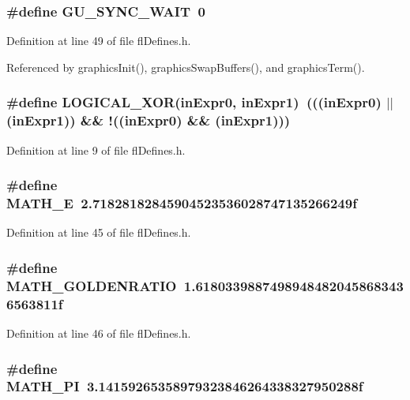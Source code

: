 \subsubsection{\setlength{\rightskip}{0pt plus 5cm}\#define GU\_\-SYNC\_\-WAIT~0}\label{flDefines_8h_0d7196c453c3aa3d6738b949cb2f82e6}




Definition at line 49 of file fl\-Defines.h.

Referenced by graphics\-Init(), graphics\-Swap\-Buffers(), and graphics\-Term().
\subsubsection{\setlength{\rightskip}{0pt plus 5cm}\#define LOGICAL\_\-XOR(in\-Expr0, in\-Expr1)~(((in\-Expr0) $|$$|$ (in\-Expr1)) \&\& !((in\-Expr0) \&\& (in\-Expr1)))}\label{flDefines_8h_054a81397da45dd4089bd2f9757572a0}




Definition at line 9 of file fl\-Defines.h.
\subsubsection{\setlength{\rightskip}{0pt plus 5cm}\#define MATH\_\-E~2.71828182845904523536028747135266249f}\label{flDefines_8h_9ee56816d83d03ce2644259a848f0ecb}




Definition at line 45 of file fl\-Defines.h.
\subsubsection{\setlength{\rightskip}{0pt plus 5cm}\#define MATH\_\-GOLDENRATIO~1.61803398874989484820458683436563811f}\label{flDefines_8h_bcfb6c818bbf0dbaf7500967c078672c}




Definition at line 46 of file fl\-Defines.h.
\subsubsection{\setlength{\rightskip}{0pt plus 5cm}\#define MATH\_\-PI~3.14159265358979323846264338327950288f}\label{flDefines_8h_c58cbaeae310f551049f77b7c098599e}




